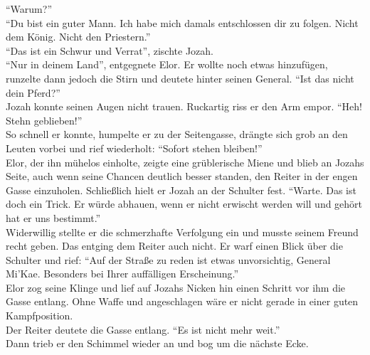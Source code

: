 ``Warum?''\\
``Du bist ein guter Mann. Ich habe mich damals entschlossen dir zu folgen. Nicht dem König. Nicht 
den Priestern.''\\
``Das ist ein Schwur und Verrat'', zischte Jozah.\\
``Nur in deinem Land'', entgegnete Elor. Er wollte noch etwas hinzufügen, runzelte dann jedoch die 
Stirn und deutete hinter seinen General. ``Ist das nicht dein Pferd?''\\
Jozah konnte seinen Augen nicht trauen. Ruckartig riss er den Arm empor. ``Heh! Stehn geblieben!''\\
So schnell er konnte, humpelte er zu der Seitengasse, drängte sich grob an den Leuten vorbei und 
rief wiederholt: ``Sofort stehen bleiben!''\\
Elor, der ihn mühelos einholte, zeigte eine grüblerische Miene und blieb an Jozahs Seite, auch wenn 
seine Chancen deutlich besser standen, den Reiter in der engen Gasse einzuholen. Schließlich hielt 
er Jozah an der Schulter fest. ``Warte. Das ist doch ein Trick. Er würde abhauen, wenn er nicht 
erwischt werden will und gehört hat er uns bestimmt.''\\
Widerwillig stellte er die schmerzhafte Verfolgung ein und musste seinem Freund recht geben. Das 
entging dem Reiter auch nicht. Er warf einen Blick über die Schulter und rief: ``Auf der Straße zu 
reden ist etwas unvorsichtig, General Mi'Kae. Besonders bei Ihrer auffälligen Erscheinung.''\\
Elor zog seine Klinge und lief auf Jozahs Nicken hin einen Schritt vor ihm die Gasse entlang. Ohne 
Waffe und angeschlagen wäre er nicht gerade in einer guten Kampfposition.\\
Der Reiter deutete die Gasse entlang. ``Es ist nicht mehr weit.''\\ 
Dann trieb er den Schimmel wieder an und bog um die nächste Ecke.\\


